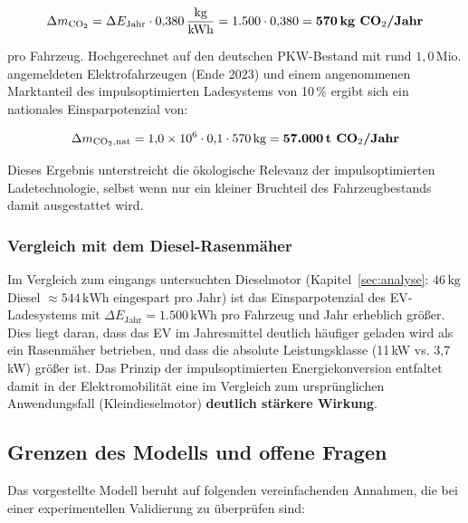 ﻿\documentclass[a4paper,12pt]{article}
\begin{document}
\begin{equation}
  \Delta m_{\text{CO}_2} = \Delta E_\text{Jahr}
    \cdot 0{,}380\,\frac{\text{kg}}{\text{kWh}}
  = 1.500 \cdot 0{,}380 = \textbf{570\,\text{kg CO${}_2$/Jahr}}
\end{equation}

pro Fahrzeug. Hochgerechnet auf den deutschen PKW-Bestand mit rund
$1{,}0\,\text{Mio.}$ angemeldeten Elektrofahrzeugen (Ende 2023) und
einem angenommenen Marktanteil des impulsoptimierten Ladesystems von
10\,\% ergibt sich ein nationales Einsparpotenzial von:

\begin{equation}
  \Delta m_{\text{CO}_2,\text{nat}} = 1{,}0 \times 10^6 \cdot 0{,}1
    \cdot 570\,\text{kg}
  = \textbf{57.000\,\text{t CO${}_2$/Jahr}}
\end{equation}

Dieses Ergebnis unterstreicht die ökologische Relevanz der
impulsoptimierten Ladetechnologie, selbst wenn nur ein kleiner Bruchteil
des Fahrzeugbestands damit ausgestattet wird.

\subsubsection{Vergleich mit dem Diesel-Rasenmäher}

Im Vergleich zum eingangs untersuchten Dieselmotor (Kapitel~\ref{sec:analyse}:
$46\,\text{kg}$ Diesel $\approx 544\,\text{kWh}$ eingespart pro Jahr)
ist das Einsparpotenzial des EV-Ladesystems mit
$\Delta E_\text{Jahr} = 1.500\,\text{kWh}$ pro Fahrzeug und Jahr erheblich größer.
Dies liegt daran, dass das EV im Jahresmittel deutlich häufiger geladen
wird als ein Rasenmäher betrieben, und dass die absolute Leistungsklasse
(11\,kW vs. 3{,}7\,kW) größer ist. Das Prinzip der impulsoptimierten
Energiekonversion entfaltet damit in der Elektromobilität eine
im Vergleich zum ursprünglichen Anwendungsfall (Kleindieselmotor)
\textbf{deutlich stärkere Wirkung}.

\subsection{Grenzen des Modells und offene Fragen}

Das vorgestellte Modell beruht auf folgenden vereinfachenden Annahmen,
die bei einer experimentellen Validierung zu überprüfen sind:
\end{document}
